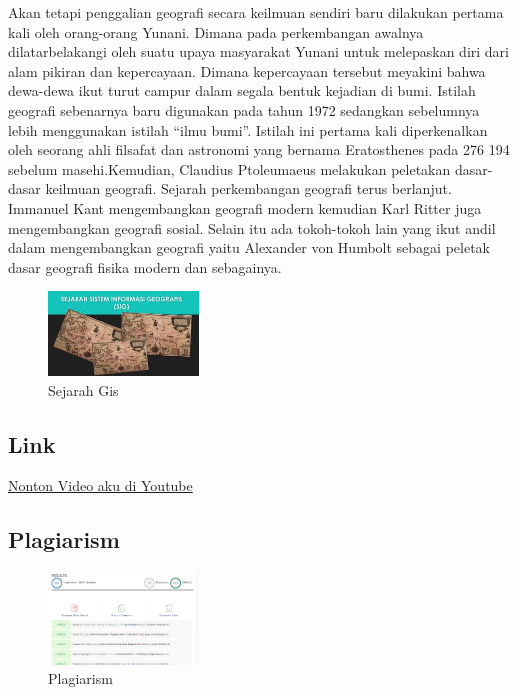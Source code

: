 Akan tetapi penggalian geografi secara keilmuan sendiri baru dilakukan pertama kali oleh orang-orang Yunani. Dimana pada perkembangan awalnya dilatarbelakangi oleh suatu upaya masyarakat Yunani untuk melepaskan diri dari alam pikiran dan kepercayaan. Dimana kepercayaan tersebut meyakini bahwa dewa-dewa ikut turut campur dalam segala bentuk kejadian di bumi.\hfill\break
Istilah geografi sebenarnya baru digunakan pada tahun 1972 sedangkan sebelumnya lebih menggunakan istilah “ilmu bumi”. Istilah ini pertama kali diperkenalkan oleh seorang ahli filsafat dan astronomi yang bernama Eratosthenes pada 276 194 sebelum masehi.Kemudian, Claudius Ptoleumaeus melakukan peletakan dasar-dasar keilmuan geografi.\hfill\break
Sejarah perkembangan geografi terus berlanjut. Immanuel Kant mengembangkan geografi modern kemudian Karl Ritter juga mengembangkan geografi sosial.\hfill\break
Selain itu ada tokoh-tokoh lain yang ikut andil dalam mengembangkan geografi yaitu Alexander von Humbolt sebagai peletak dasar geografi fisika modern dan sebagainya.\hfill\break

\begin{figure}[H]
	\includegraphics[width=4cm]{figures/1174057/sejarah.jpg}
	\centering
	\caption{Sejarah Gis}
\end{figure}

\subsection{Link}
\href{https://www.youtube.com/watch?v=XdUSIKaI3zc}{Nonton Video aku di Youtube}
\subsection{Plagiarism}
\begin{figure}[H]
	\includegraphics[width=4cm]{figures/1174057/plagiarisme.png}
	\centering
	\caption{Plagiarism}
\end{figure}